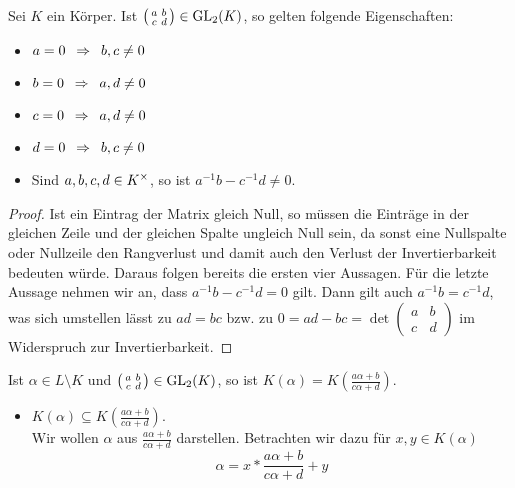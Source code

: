 \begin{exercisePage}
    \setcounter{taskcount}{6}
    
    \newcommand{\bruch}{\frac{a \alpha + b}{c \alpha + d}}
    \newcommand{\mymatrix}{ \left( \begin{smallmatrix} a & b \\ c & d \end{smallmatrix} \right)}
    
    \begin{lemma}\label{lemma: 1_7_invertierbarkeit}
        Sei $K$ ein Körper. Ist $\mymatrix \in \GL_2(K)$, so gelten folgende Eigenschaften:
        \begin{itemize}[leftmargin=*, nolistsep, topsep=-\parskip]
            \item $a = 0 \enskip \Rightarrow \enskip b,c \neq 0$ 
            \item $b = 0 \enskip \Rightarrow \enskip a,d \neq 0$
            \item $c = 0 \enskip \Rightarrow \enskip a,d \neq 0$
            \item $d = 0 \enskip \Rightarrow \enskip b,c \neq 0$
            \item Sind $a,b,c,d \in {K}^{\times}$, so ist $a^{-1} b - c^{-1} d \neq 0$.
        \end{itemize}
    \end{lemma}
    \begin{proof}
        Ist ein Eintrag der Matrix gleich Null, so müssen die Einträge in der gleichen Zeile und der gleichen Spalte ungleich Null sein, da sonst eine Nullspalte oder Nullzeile den Rangverlust und damit auch den Verlust der Invertierbarkeit bedeuten würde. Daraus folgen bereits die ersten vier Aussagen. Für die letzte Aussage nehmen wir an, dass $a^{-1} b - c^{-1} d = 0$ gilt. Dann gilt auch $a^{-1} b = c^{-1} d$, was sich umstellen lässt zu $ad = bc$ bzw. zu $0 = ad - bc = \det\mymatrix$ im Widerspruch zur Invertierbarkeit.
    \end{proof}
    \begin{homework}
        Ist $\alpha \in L \setminus K$ und $\mymatrix \in \GL_2(K)$, so ist $K(\alpha) = K\left( \bruch \right)$.
    \end{homework}
    \begin{itemize}[leftmargin=*]
        \item $K(\alpha) \subseteq K(\bruch)$. \\
        Wir wollen $\alpha$ aus $\bruch$ darstellen. Betrachten wir dazu für $x,y \in K(\alpha)$
        \begin{equation*}
            \alpha = x * \bruch + y
        \end{equation*}
        

\end{itemize}
\end{exercisePage}
